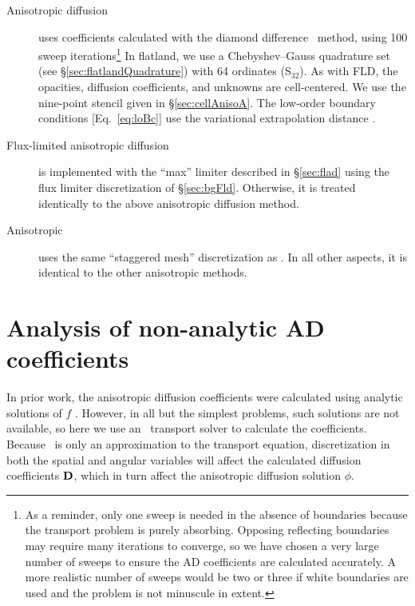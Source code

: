 \begin{description}
  \item[Anisotropic diffusion] uses
    coefficients calculated with the diamond difference \SN\ meth\-od, using
    100 sweep iterations\footnote{%
      As a reminder, only one sweep is needed in the absence of boundaries
      because the transport problem is purely absorbing. Opposing reflecting
      boundaries may require many iterations to converge, so we have chosen a
      very large number of sweeps to ensure the AD coefficients are calculated
      accurately. A more realistic number of sweeps would be two or three if
      white boundaries are used and the problem is not minuscule in extent.
    }
    In flatland, we use a Chebyshev--Gauss quadrature set
    (see \S\ref{sec:flatlandQuadrature}) with 64 ordinates (S$_{32}$).
    As with FLD, the opacities, diffusion coefficients, and unknowns are
    cell-centered. We use the nine-point stencil given in
    \S\ref{sec:cellAnisoA}. The low-order boundary conditions
    [Eq.~\eqref{eq:loBc}] use the variational extrapolation distance .

  \item[Flux-limited anisotropic diffusion] is implemented with the
    ``max'' limiter described in \S\ref{sec:flad} using the flux limiter
    discretization of \S\ref{sec:bgFld}. Otherwise, it is treated identically to
    the above anisotropic diffusion method.

  \item[Anisotropic \Pone] uses the same ``staggered mesh'' discretization
    as \Pone. In all other aspects, it is identical to the other anisotropic
    methods.

\end{description}

\section{Analysis of non-analytic AD coefficients}

In prior work, the anisotropic diffusion coefficients were calculated using
analytic solutions of $f$ \cite{Lar2009c}. However, in all but the simplest
problems, such solutions are not available, so here we use an \SN\ transport
solver to
calculate the coefficients. Because \SN\ is only an approximation to the
transport equation, discretization in both the spatial and angular variables
will affect the calculated diffusion coefficients $\mathbf{D}$, which in turn affect
the anisotropic diffusion solution $\phi$.

